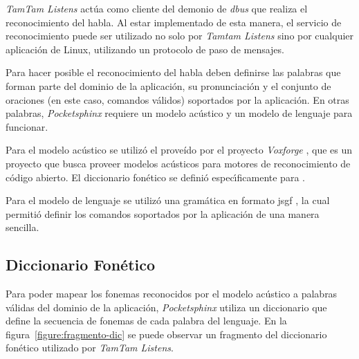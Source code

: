 \emph{TamTam Listens} act\'ua como cliente
del demonio de \emph{dbus} que realiza el reconocimiento del habla. Al estar implementado de esta manera, el
servicio de reconocimiento puede ser utilizado no solo por \emph{Tamtam Listens} sino por cualquier aplicaci\'on 
de Linux, utilizando un protocolo de paso de mensajes. 

Para hacer posible el reconocimiento del habla deben definirse las palabras que forman parte del dominio de 
la aplicaci\'on, su pronunciaci\'on y el conjunto de oraciones (en este caso, comandos v\'alidos) soportados por la aplicaci\'on. En otras palabras, \emph{Pocketsphinx} requiere un modelo ac\'ustico y un modelo de lenguaje para funcionar.
 
Para el modelo ac\'ustico se utiliz\'o el prove\'ido por el proyecto \emph{Voxforge}
\cite{Voxforge}, que es un proyecto que busca proveer modelos ac\'usticos para motores de reconocimiento
de c\'odigo abierto. El diccionario fon\'etico se defini\'o espec{\'\i}ficamente para .

Para el modelo de lenguaje se utiliz\'o una gram\'atica en formato \gls{jsgf} 
\cite{JSGF2000}, la cual permiti\'o definir los comandos soportados por la aplicaci\'on de una manera sencilla. 

\subsection{Diccionario Fon\'etico}

Para poder mapear los fonemas reconocidos por el modelo ac\'ustico a palabras v\'alidas del dominio de la 
aplicaci\'on, \emph{Pocketsphinx} utiliza un diccionario que define la secuencia de fonemas de cada palabra 
del lenguaje. En la figura~\ref{figure:fragmento-dic} se puede observar un fragmento del diccionario fon\'etico
utilizado por \emph{TamTam Listens}.

\lstset{
  basicstyle=\scriptsize,        %
  breakatwhitespace=false,         %
  frame=single,                    %
  language=Octave,                 %
  numbersep=5pt,                   %
  showstringspaces=false,          %
  stepnumber=2,                    %
  tabsize=2                       %
}

